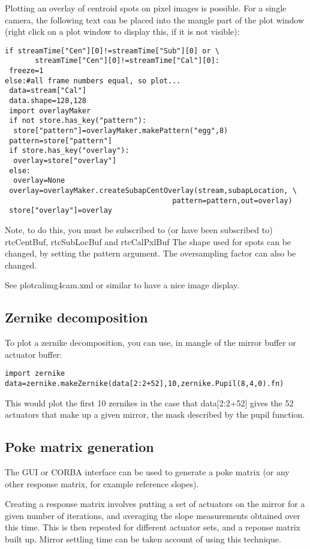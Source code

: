 \documentclass[a4,10pt]{article}
\begin{document}
Plotting an overlay of centroid spots on pixel images is possible.
For a single camera, the following text can be placed into the mangle
part of the plot window (right click on a plot window to display this,
if it is not visible):
\begin{verbatim}
if streamTime["Cen"][0]!=streamTime["Sub"][0] or \
       streamTime["Cen"][0]!=streamTime["Cal"][0]:
 freeze=1
else:#all frame numbers equal, so plot...
 data=stream["Cal"]
 data.shape=128,128
 import overlayMaker
 if not store.has_key("pattern"):
  store["pattern"]=overlayMaker.makePattern("egg",8)
 pattern=store["pattern"]
 if store.has_key("overlay"):
  overlay=store["overlay"]
 else:
  overlay=None
 overlay=overlayMaker.createSubapCentOverlay(stream,subapLocation, \
                                       pattern=pattern,out=overlay)
 store["overlay"]=overlay
\end{verbatim}

Note, to do this, you must be subscribed to (or have been subscribed
to) rtcCentBuf, rtcSubLocBuf and rtcCalPxlBuf
The shape used for spots can be changed, by setting the pattern
argument.  The oversampling factor can also be changed.

See plotcalimg4cam.xml or similar to have a nice image display.

\subsection{Zernike decomposition}
To plot a zernike decomposition, you can use, in mangle of the mirror
buffer or actuator buffer:
\begin{verbatim}
import zernike
data=zernike.makeZernike(data[2:2+52],10,zernike.Pupil(8,4,0).fn)
\end{verbatim}
This would plot the first 10 zernikes in the case that data[2:2+52]
gives the 52 actuators that make up a given mirror, the mask described
by the pupil function.

\subsection{Poke matrix generation}
The GUI or CORBA interface can be used to generate a poke matrix (or
any other response matrix, for example reference slopes).

Creating a response matrix involves putting a set of actuators on the
mirror for a given number of iterations, and averaging the slope
measurements obtained over this time.  This is then repeated for
different actuator sets, and a reponse matrix built up.  Mirror
settling time can be taken account of using this technique.
\end{document}
